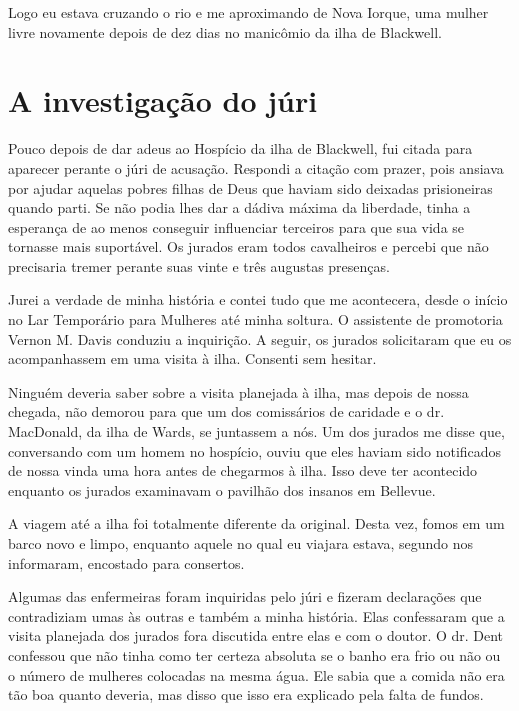 Logo eu estava cruzando o rio e me aproximando de Nova Iorque, uma
mulher livre novamente depois de dez dias no manicômio da ilha de
Blackwell.

\label{section-11}

\chapter{A investigação do
júri}\label{capuxedtulo-xvii-a-investigauxe7uxe3o-do-juxfari}

Pouco depois de dar adeus ao Hospício da ilha de Blackwell, fui citada
para aparecer perante o júri de acusação. Respondi a citação com prazer,
pois ansiava por ajudar aquelas pobres filhas de Deus que haviam sido
deixadas prisioneiras quando parti. Se não podia lhes dar a dádiva
máxima da liberdade, tinha a esperança de ao menos conseguir influenciar
terceiros para que sua vida se tornasse mais suportável. Os jurados eram
todos cavalheiros e percebi que não precisaria tremer perante suas vinte
e três augustas presenças.

Jurei a verdade de minha história e contei tudo que me acontecera, desde
o início no Lar Temporário para Mulheres até minha soltura. O assistente
de promotoria Vernon M. Davis conduziu a inquirição. A seguir, os
jurados solicitaram que eu os acompanhassem em uma visita à ilha.
Consenti sem hesitar.

Ninguém deveria saber sobre a visita planejada à ilha, mas depois de
nossa chegada, não demorou para que um dos comissários de caridade e o
dr. MacDonald, da ilha de Wards, se juntassem a nós. Um dos jurados me
disse que, conversando com um homem no hospício, ouviu que eles haviam
sido notificados de nossa vinda uma hora antes de chegarmos à ilha. Isso
deve ter acontecido enquanto os jurados examinavam o pavilhão dos
insanos em Bellevue.

A viagem até a ilha foi totalmente diferente da original. Desta vez,
fomos em um barco novo e limpo, enquanto aquele no qual eu viajara
estava, segundo nos informaram, encostado para consertos.

Algumas das enfermeiras foram inquiridas pelo júri e fizeram declarações
que contradiziam umas às outras e também a minha história. Elas
confessaram que a visita planejada dos jurados fora discutida entre elas
e com o doutor. O dr. Dent confessou que não tinha como ter certeza
absoluta se o banho era frio ou não ou o número de mulheres colocadas na
mesma água. Ele sabia que a comida não era tão boa quanto deveria, mas
disso que isso era explicado pela falta de fundos.

